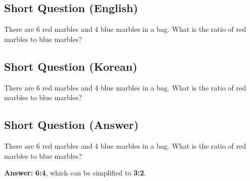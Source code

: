 \cleardoublepage
\subsection*{Short Question (English)}
There are 6 red marbles and 4 blue marbles in a bag. What is the ratio of red marbles to blue marbles?


\newpage
\subsection*{Short Question (Korean)}
There are 6 red marbles and 4 blue marbles in a bag. What is the ratio of red marbles to blue marbles?


\newpage
\subsection*{Short Question (Answer)}
There are 6 red marbles and 4 blue marbles in a bag. What is the ratio of red marbles to blue marbles?

\textbf{Answer:} \textbf{6:4}, which can be simplified to \textbf{3:2}.
